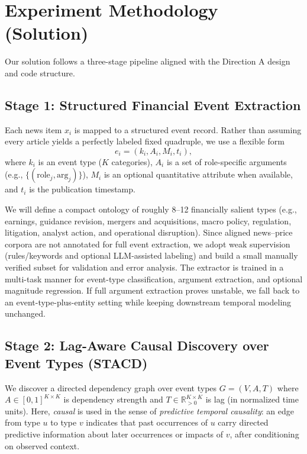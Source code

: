 \documentclass[sigconf,review]{acmart}
\begin{document}
\section{Experiment Methodology (Solution)}
Our solution follows a three-stage pipeline aligned with the Direction A design and code structure.

\subsection{Stage 1: Structured Financial Event Extraction}
Each news item \(x_i\) is mapped to a structured event record. Rather than assuming every article yields a perfectly labeled fixed quadruple, we use a flexible form
\begin{equation}
e_i = (k_i, A_i, M_i, t_i),
\end{equation}
where \(k_i\) is an event type (\(K\) categories), \(A_i\) is a set of role-specific arguments (e.g., \(\{(\text{role}_j,\text{arg}_j)\}\)), \(M_i\) is an optional quantitative attribute when available, and \(t_i\) is the publication timestamp.

We will define a compact ontology of roughly 8--12 financially salient types (e.g., earnings, guidance revision, mergers and acquisitions, macro policy, regulation, litigation, analyst action, and operational disruption). Since aligned news--price corpora are not annotated for full event extraction, we adopt weak supervision (rules/keywords and optional LLM-assisted labeling) and build a small manually verified subset for validation and error analysis. The extractor is trained in a multi-task manner for event-type classification, argument extraction, and optional magnitude regression. If full argument extraction proves unstable, we fall back to an event-type-plus-entity setting while keeping downstream temporal modeling unchanged.

\subsection{Stage 2: Lag-Aware Causal Discovery over Event Types (STACD)}
We discover a directed dependency graph over event types \(G=(V,A,T)\) where \(A\in[0,1]^{K\times K}\) is dependency strength and \(T\in\mathbb{R}_{>0}^{K\times K}\) is lag (in normalized time units). Here, \emph{causal} is used in the sense of \emph{predictive temporal causality}: an edge from type \(u\) to type \(v\) indicates that past occurrences of \(u\) carry directed predictive information about later occurrences or impacts of \(v\), after conditioning on observed context.
\end{document}
